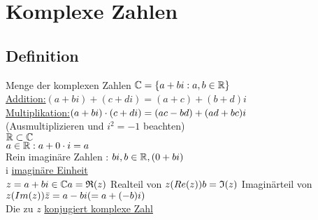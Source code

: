 
\newcommand{\seriesn}[1]{\sum\limits_{i=k}^{n} #1}
\newcommand{\seriesnplus}[1]{\sum\limits_{i=k}^{n+1} #1}
\newcommand{\series}[1]{\sum\limits_{i=k}^{\infty} #1}
\newcommand{\seriesnull}[1]{\sum\limits_{i=0}^{\infty} #1}
\usepackage[normalem]{ulem}
\usepackage{blkarray}
\usepackage[margin=15mm]{geometry}
\newcommand{\abs}[1]{\lvert #1 \rvert}
\newcommand{\cucubr}[7]{%
\pgfmathsetmacro{\helpangleedge}{acos(1-pow(#6,2)/2/pow(#2+#5,2))}%
\pgfmathsetmacro{\turnangleedge}{90+(\helpangleedge/2)}%
\pgfmathsetmacro{\helpanglemid}{acos(1-pow(#6,2)/2/pow(#2+#5+2*#6,2))}%
\pgfmathsetmacro{\turnanglemid}{90-(\helpanglemid/2)}%
\pgfmathsetmacro{\halfangle}{(#4-#3)/2+#3}%
\pgfmathsetmacro{\midradius}{#2+#5+#6}%
\pgfmathsetmacro{\outerradius}{#2+#5+1.88*#6}%
\pgfmathsetmacro{\firstmidanglestart}{mod(\halfangle-\helpanglemid+180,360)}%
\pgfmathsetmacro{\secondmidanglestart}{mod(\halfangle+\helpanglemid+180,360)}%
\pgfmathsetmacro{\firstmidanglestop}{mod(\halfangle-\helpanglemid/2+180,360)-\turnanglemid}%
\pgfmathsetmacro{\secondmidanglestop}{mod(\halfangle+\helpanglemid/2+180,360)++\turnanglemid}%
%
\draw[#7] (#1) ++ (\halfangle:\outerradius) arc (\firstmidanglestop:\firstmidanglestart:#6) arc (\halfangle-\helpanglemid:#3+\helpangleedge:\midradius) arc (#3+270+\turnangleedge+\helpangleedge/2:#3+270+\helpangleedge/2:#6) ;%
%
\draw[#7] (#1) ++ (\halfangle:\outerradius) arc (\secondmidanglestop:\secondmidanglestart:#6) arc (\halfangle+\helpanglemid:#4-\helpangleedge:\midradius) arc (#4+90-\turnangleedge-\helpangleedge/2:#4+90-\helpangleedge/2:#6);%
}

\tableofcontents

\section{Komplexe Zahlen}
\subsection{Definition}
Menge der komplexen Zahlen $\mathbb{C} =\{a+bi : a,b \in \mathbb{R}\}$\\
\underline{Addition:}$(a+bi) + (c+di) = (a+c)+(b+d)i$\\
\underline{Multiplikation:}$(a+bi) \cdot (c+di) = (ac -bd) + (ad+bc)i$\\
\hspace*{2.75cm}(Ausmultiplizieren und $i^2 =-1$ beachten)\\
$\mathbb{R} \subset \mathbb{C}$\\
$a \in \mathbb{R} : a + 0 \cdot i = a$\\
Rein imagin\"are Zahlen : $bi , b \in \mathbb{R}, (0 + bi)$\\
i \underline{imagin\"are Einheit}\\
$z = a+bi \in \mathbb{C}\\
a = \mathfrak{R}(z)$ Realteil von $z (Re(z))\\
b = \mathfrak{I}(z)$ Imagin\"arteil von $z (Im(z))\\
\bar{z} = a - bi (= a + (-b)i)$\\
Die zu $z$ \uline{konjugiert komplexe Zahl}\\
